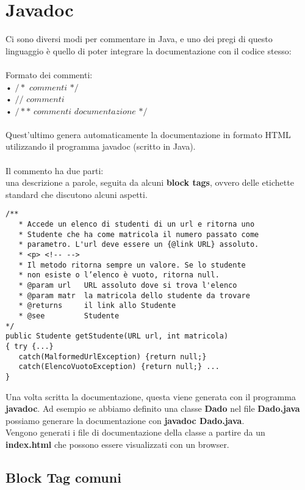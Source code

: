 \documentclass{article}
\begin{document}
\newpage 

\section{Javadoc}

Ci sono diversi modi per commentare in Java, e uno dei pregi di questo linguaggio è 
quello di poter integrare la documentazione con il codice stesso:\\
\\
Formato dei commenti:
\\
• $/*$ $commenti$ $*/$
\\
• $//$ $commenti$
\\
• $/**$ $commenti$ $documentazione$ $*/$
\\
\\
Quest'ultimo genera automaticamente la documentazione in formato HTML utilizzando il 
programma javadoc (scritto in Java).\\
\\
Il commento ha due parti:
\\
una descrizione a parole, seguita da alcuni \textbf{block tags}, ovvero delle etichette standard che discutono alcuni aspetti.
\\
\begin{verbatim}
/**
   * Accede un elenco di studenti di un url e ritorna uno
   * Studente che ha come matricola il numero passato come
   * parametro. L'url deve essere un {@link URL} assoluto.
   * <p> <!-- -->
   * Il metodo ritorna sempre un valore. Se lo studente
   * non esiste o l’elenco è vuoto, ritorna null.
   * @param url   URL assoluto dove si trova l'elenco
   * @param matr  la matricola dello studente da trovare
   * @returns     il link allo Studente
   * @see         Studente
*/
public Studente getStudente(URL url, int matricola)
{ try {...}
   catch(MalformedUrlException) {return null;}
   catch(ElencoVuotoException) {return null;} ...
}
\end{verbatim}
Una volta scritta la documentazione, questa viene generata con il programma \textbf{javadoc}.
Ad esempio se abbiamo definito una classe \textbf{Dado} nel file \textbf{Dado.java} possiamo
generare la documentazione con \textbf{javadoc Dado.java}.
\\
Vengono generati i file di documentazione della classe a partire da un \textbf{index.html} che 
possono essere visualizzati con un browser.

\newpage

\subsection{Block Tag comuni}
\end{document}
